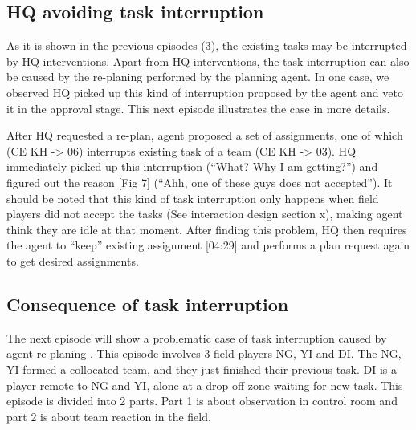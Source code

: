 \subsection{HQ avoiding task interruption}
As it is shown in the previous episodes (3), the existing tasks may be interrupted by HQ interventions. Apart from HQ interventions, the task interruption can also be caused by the re-planing performed by the planning agent. In one case, we observed HQ picked up this kind of interruption proposed by the agent and veto it in the approval stage. This next episode illustrates the case in more details. \\

\noindent{} 


After HQ requested a re-plan, agent proposed a set of assignments, one of which (CE KH -> 06) interrupts existing task of a team (CE KH -> 03). HQ immediately picked up this interruption (``What? Why I am getting?'') and figured out the reason [Fig 7] (``Ahh, one of these guys does not accepted''). It should be noted that this kind of task interruption only happens when field players did not accept the tasks (See interaction design section x), making agent think they are idle at that moment. After finding this problem, HQ then requires the agent to ``keep'' existing assignment [04:29] and performs a plan request again to get desired assignments. \\


\subsection{Consequence of task interruption}
The next episode will show a problematic case of task interruption caused by agent re-planing . This episode involves 3 field players NG, YI and DI. The NG, YI formed a collocated team, and they just finished their previous task. DI is a player remote to NG and YI, alone at a drop off zone waiting for new task. This episode is divided into 2 parts. Part 1 is about observation in control room and part 2 is about team reaction in the field.\\

